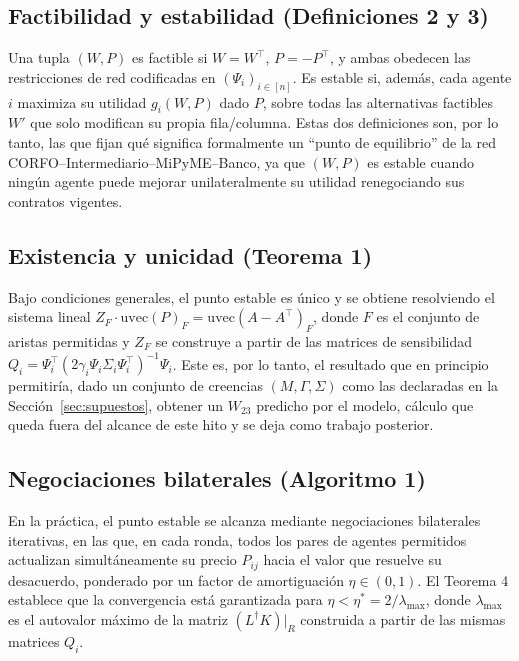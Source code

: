 \subsection{Factibilidad y estabilidad (Definiciones 2 y 3)}

Una tupla $(W,P)$ es factible si $W=W^\top$, $P=-P^\top$, y ambas obedecen las restricciones de red codificadas en $(\Psi_i)_{i\in[n]}$. Es estable si, además, cada agente $i$ maximiza su utilidad $g_i(W,P)$ dado $P$, sobre todas las alternativas factibles $W'$ que solo modifican su propia fila/columna. Estas dos definiciones son, por lo tanto, las que fijan qué significa formalmente un ``punto de equilibrio'' de la red CORFO--Intermediario--MiPyME--Banco, ya que $(W,P)$ es estable cuando ningún agente puede mejorar unilateralmente su utilidad renegociando sus contratos vigentes.

\subsection{Existencia y unicidad (Teorema 1)}

Bajo condiciones generales, el punto estable es único y se obtiene resolviendo el sistema lineal $Z_F \cdot \mathrm{uvec}(P)_F = \mathrm{uvec}(A-A^\top)_F$, donde $F$ es el conjunto de aristas permitidas y $Z_F$ se construye a partir de las matrices de sensibilidad $Q_i = \Psi_i^\top(2\gamma_i \Psi_i \Sigma_i \Psi_i^\top)^{-1}\Psi_i$. Este es, por lo tanto, el resultado que en principio permitiría, dado un conjunto de creencias $(M,\Gamma,\Sigma)$ como las declaradas en la Sección~\ref{sec:supuestos}, obtener un $W_{23}$ predicho por el modelo, cálculo que queda fuera del alcance de este hito y se deja como trabajo posterior.

\subsection{Negociaciones bilaterales (Algoritmo 1)}

En la práctica, el punto estable se alcanza mediante negociaciones bilaterales iterativas, en las que, en cada ronda, todos los pares de agentes permitidos actualizan simultáneamente su precio $P_{ij}$ hacia el valor que resuelve su desacuerdo, ponderado por un factor de amortiguación $\eta \in (0,1)$. El Teorema 4 establece que la convergencia está garantizada para $\eta < \eta^* = 2/\lambda_{\max}$, donde $\lambda_{\max}$ es el autovalor máximo de la matriz $(L^\dagger K)|_R$ construida a partir de las mismas matrices $Q_i$.

